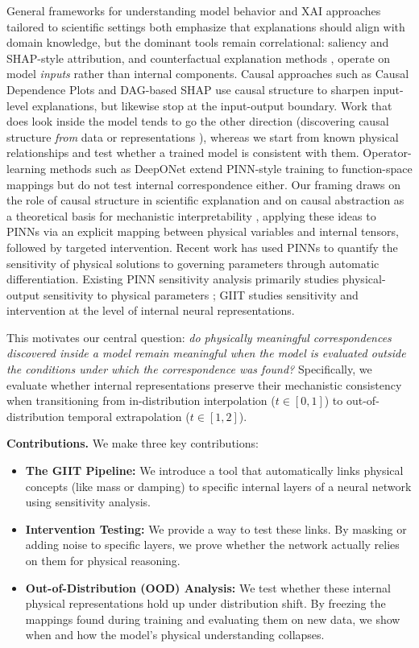 \documentclass{article}
\begin{document}
General frameworks
for understanding model behavior \citep{murdoch2019pdr} and XAI approaches
tailored to scientific settings \citep{roscher2020xai} both emphasize that
explanations should align with domain knowledge, but the dominant tools
remain correlational: saliency and SHAP-style attribution, and
counterfactual explanation methods \citep{chou2022counterfactual}, operate
on model \emph{inputs} rather than internal components. Causal approaches
such as Causal Dependence Plots \citep{loftus2023cdp} and DAG-based SHAP
\citep{terminassian2023dag} use causal structure to sharpen input-level
explanations, but likewise stop at the input-output boundary. Work that
does look inside the model tends to go the other direction (discovering
causal structure \emph{from} data or representations
\citep{renero2025rex}), whereas we start from known physical relationships
and test whether a trained model is consistent with them. Operator-learning
methods such as DeepONet \citep{lu2021deeponet} extend PINN-style training
to function-space mappings but do not test internal correspondence either.
Our framing draws on the role of causal structure in scientific explanation
\citep{buijsman2023causal} and on causal abstraction as a theoretical basis
for mechanistic interpretability \citep{geiger2025mechinterp}, applying
these ideas to PINNs via an explicit mapping between physical variables and
internal tensors, followed by targeted intervention. Recent work has used PINNs to quantify the sensitivity of physical solutions to governing parameters through automatic differentiation. Existing PINN sensitivity analysis primarily studies physical-output sensitivity to physical parameters \citep{hanna2024sensitivity}; GIIT studies sensitivity and intervention at the level of internal neural representations.

This motivates our central question: \emph{do physically meaningful
correspondences discovered inside a model remain meaningful when the model
is evaluated outside the conditions under which the correspondence was
found?} Specifically, we evaluate whether internal representations preserve
their mechanistic consistency when transitioning from in-distribution interpolation
($t \in [0, 1]$) to out-of-distribution temporal extrapolation ($t \in [1, 2]$).

\textbf{Contributions.} We make three key contributions:
\begin{itemize}
    \item \textbf{The GIIT Pipeline:} We introduce a tool that automatically links physical concepts (like mass or damping) to specific internal layers of a neural network using sensitivity analysis.
    \item \textbf{Intervention Testing:} We provide a way to test these links. By masking or adding noise to specific layers, we prove whether the network actually relies on them for physical reasoning.
    \item \textbf{Out-of-Distribution (OOD) Analysis:} We test whether these internal physical representations hold up under distribution shift. By freezing the mappings found during training and evaluating them on new data, we show when and how the model's physical understanding collapses.
\end{itemize}
\end{document}

